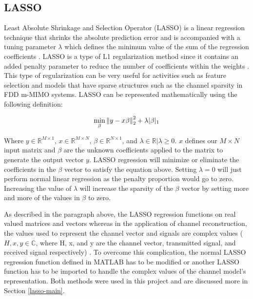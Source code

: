 \subsection{LASSO} \label{lasso-back}

Least Absolute Shrinkage and Selection Operator (LASSO) is a linear regression technique that shrinks the absolute prediction error and is accompanied with a tuning parameter $\lambda$ which defines the minimum value of the sum of the regression coefficients \cite{Ranstam2018}. LASSO is a type of L1 regularization method since it contains an added penalty parameter to reduce the number of coefficients within the weights \cite{Ranstam2018,Tibshirani2013}. This type of regularization can be very useful for activities such as feature selection and models that have sparse structures such as the channel sparsity in FDD m-MIMO systems. LASSO can be represented mathematically using the following definition:

\[ \min_{\beta} \left\lVert y - x\beta\right\rVert^2_2 + \lambda |\beta|_1 \]

Where \(y \in \mathbb{R}^{M \times 1}\),  \(x \in \mathbb{R}^{M \times N}\), \(\beta \in \mathbb{R}^{N \times 1}\), and \( { \lambda \in \mathbb{R} | \lambda \geq 0 } \). $x$ defines our $M \times N$ input matrix and $\beta$ are the unknown coefficients applied to the matrix to generate the output vector $y$. LASSO regression will minimize or eliminate the coefficients in the $\beta$ vector to satisfy the equation above. Setting $\lambda = 0 $ will just perform normal linear regression as the penalty proportion would go to zero. Increasing the value of $\lambda$ will increase the sparsity of the $\beta$ vector by setting more and more of the values in $\beta$ to zero.

As described in the paragraph above, the LASSO regression functions on real valued matrices and vectors whereas in the application of channel reconstruction, the values used to represent the channel vector and signals are complex values ($H,x,y \in \mathbb{C}$, where H, x, and y are the channel vector, transmitted signal, and received signal respectively) \cite{Liu2016}. To overcome this complication, the normal LASSO regression function defined in MATLAB has to be modified or another LASSO function has to be imported to handle the complex values of the channel model's representation. Both methods were used in this project and are discussed more in Section \ref{lasso-main}.


